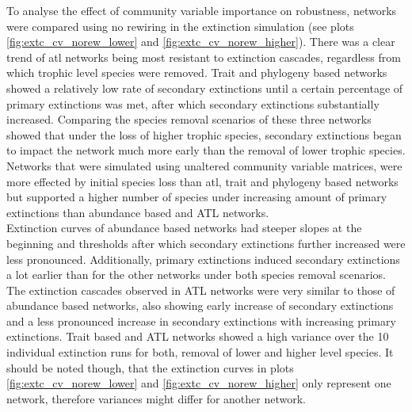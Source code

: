 \documentclass[12pt,a4paper]{article}
\begin{document}
To analyse the effect of community variable importance on robustness, networks were compared using no rewiring in the extinction simulation (see plots \ref{fig:extc_cv_norew_lower} and \ref{fig:extc_cv_norew_higher}). There was a clear trend of atl networks being most resistant to extinction cascades, regardless from which trophic level species were removed. Trait and phylogeny based networks showed a relatively low rate of secondary extinctions until a certain percentage of primary extinctions was met, after which secondary extinctions substantially increased. Comparing the species removal scenarios of these three networks showed that under the loss of higher trophic species, secondary extinctions began to impact the network much more early than the removal of lower trophic species. Networks that were simulated using unaltered community variable matrices, were more effected by initial species loss than atl, trait and phylogeny based networks but supported a higher number of species under increasing amount of primary extinctions than abundance based and ATL networks.\\
Extinction curves of abundance based networks had steeper slopes at the beginning and thresholds after which secondary extinctions further increased were less pronounced. Additionally, primary extinctions induced secondary extinctions a lot earlier than for the other networks under both species removal scenarios. The extinction cascades observed in ATL networks were very similar to those of abundance based networks, also showing early increase of secondary extinctions and a less pronounced increase in secondary extinctions with increasing primary extinctions. Trait based and ATL networks showed a high variance over the 10 individual extinction runs for both, removal of lower and higher level species. It should be noted though, that the extinction curves in plots \ref{fig:extc_cv_norew_lower} and \ref{fig:extc_cv_norew_higher} only represent one network, therefore variances might differ for another network.

\end{document}
